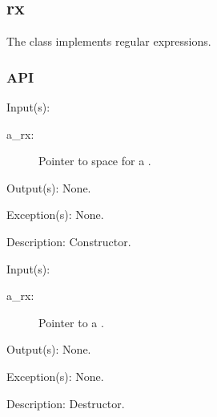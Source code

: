 %
%
%
%
%              

\subsection{rx}
\label{rx}

The  class implements regular expressions.

\subsubsection{API}
\begin{capi}
\label{rx_new}
	\begin{capilist}
	\item[Input(s): ]
		\begin{description}\item[]
		\item[a\_rx: ]
			Pointer to space for a .
		\end{description}
	\item[Output(s): ] None.
	\item[Exception(s): ] None.
	\item[Description: ]
		Constructor.
	\end{capilist}
\label{rx_delete}
	\begin{capilist}
	\item[Input(s): ]
		\begin{description}\item[]
		\item[a\_rx: ]
			Pointer to a \classname{rx}.
		\end{description}
	\item[Output(s): ] None.
	\item[Exception(s): ] None.
	\item[Description: ]
		Destructor.
	\end{capilist}
\end{capi}

